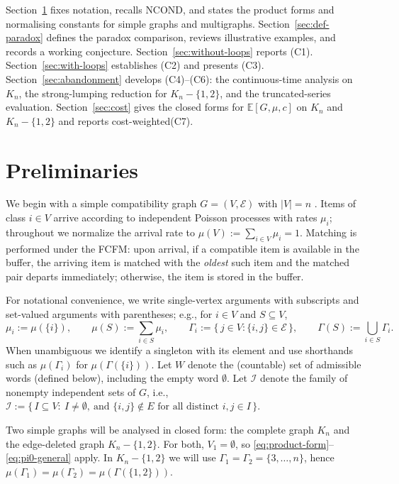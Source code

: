 \documentclass[11pt]{article}
\begin{document}
Section~\ref{sec:prelim} fixes notation, recalls \textsc{NCOND}, and states the product forms and normalising constants for simple graphs and multigraphs. Section~\ref{sec:def-paradox} defines the paradox comparison, reviews illustrative examples, and records a working conjecture. Section~\ref{sec:without-loops} reports (C1). Section~\ref{sec:with-loops} establishes (C2) and presents (C3). Section~\ref{sec:abandonment} develops (C4)–(C6): the continuous-time analysis on \(K_n\), the strong-lumping reduction for \(K_n-\{1,2\}\), and the truncated-series evaluation. Section~\ref{sec:cost} gives the closed forms for \(\mathbb{E}[G,\mu,c]\) on \(K_n\) and \(K_n-\{1,2\}\) and reports cost-weighted(C7). 

\section{Preliminaries}\label{sec:prelim}

We begin with a simple compatibility graph $G=(V,\mathcal{E})$ with $|V|=n$ .
Items of class $i\in V$ arrive according to independent Poisson processes with rates $\mu_i$; throughout we normalize the arrival rate to $\mu(V):=\sum_{i\in V}\mu_i=1$.
Matching is performed under the FCFM: upon arrival, if a compatible item is available in the buffer, the arriving item is matched with the \emph{oldest} such item and the matched pair departs immediately; otherwise, the item is stored in the buffer.

For notational convenience, we write single-vertex arguments with subscripts and set-valued arguments with parentheses; e.g., for $i\in V$ and $S\subseteq V$,
\[
\mu_i:=\mu(\{i\}),\qquad 
\mu(S):=\sum_{i\in S}\mu_i,\qquad
\Gamma_i:=\{\,j\in V:\{i,j\}\in \mathcal{E}\,\},\qquad
\Gamma(S):=\bigcup_{i\in S}\Gamma_i.
\]
When unambiguous we identify a singleton with its element and use shorthands such as $\mu(\Gamma_i)$ for $\mu(\Gamma(\{i\}))$.
Let $W$ denote the (countable) set of admissible words (defined below), including the empty word $\emptyset$.  Let $\mathcal{I}$ denote the family of nonempty independent sets of $G$, i.e., 
$\mathcal{I}:=\{\,I\subseteq V:\ I\neq\emptyset,\ \text{and } \{i,j\}\notin E \text{ for all distinct } i,j\in I\,\}.$


Two simple graphs will be analysed in closed form: the complete graph $K_n$ and the edge-deleted graph $K_n-\{1,2\}$. 
For both, $V_1=\emptyset$, so \eqref{eq:product-form}–\eqref{eq:pi0-general} apply. 
In $K_n-\{1,2\}$ we will use $\Gamma_1=\Gamma_2=\{3,\dots,n\}$, hence $\mu(\Gamma_1)=\mu(\Gamma_2)=\mu(\Gamma(\{1,2\}))$.
\end{document}
